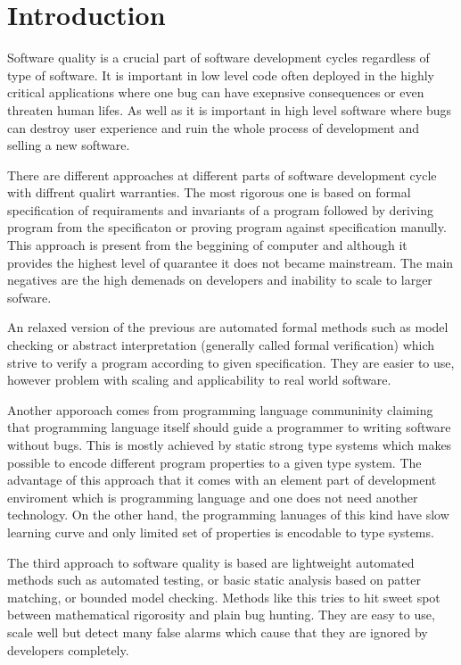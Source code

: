 \chapter{Introduction}
\label{intro}

Software quality is a crucial part of software development cycles
regardless of type of software.
It is important in low level code often deployed in the highly critical
applications where one bug can have exepnsive consequences or even threaten
human lifes.
As well as it is important in high level software where bugs can destroy
user experience and ruin the whole process of development and selling a new software.

There are different approaches at different parts of software development cycle
with diffrent qualirt warranties.
The most rigorous one is based on formal specification of requiraments and invariants
of a program followed by deriving program from the specificaton or proving program
against specification manully.
This approach is present from the beggining of computer and although it provides
the highest level of quarantee it does not became mainstream.
The main negatives are the high demenads on developers and inability to scale
to larger sofware.

An relaxed version of the previous are automated formal methods such as
model checking or abstract interpretation (generally called formal verification)
which strive to verify
a program according to given specification. They are easier to use,
however problem with scaling and applicability to real world software. 

Another apporoach comes from programming language communinity claiming
that programming language itself should guide a programmer to writing
software without bugs.
This is mostly achieved by static strong type systems which makes possible to
encode different program properties to a given type system.
The advantage of this approach that it comes with an element part of development
enviroment which is programming language and one does not need another technology.
On the other hand, the programming lanuages of this kind have slow learning curve
and only limited set of properties is encodable to type systems.

The third approach to software quality is based are lightweight automated methods
such as automated testing, or basic static analysis based on patter matching, or bounded model checking.
Methods like this tries to hit sweet spot between mathematical rigorosity and plain bug hunting.
They are easy to use, scale well but detect many false alarms which cause
that they are ignored by developers completely.

